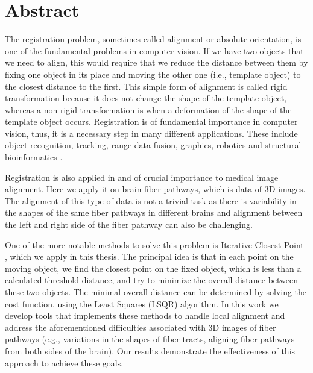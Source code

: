 \documentclass[../structure.tex]{subfiles}
\begin{document}
\chapter{Abstract}
The registration problem, sometimes called alignment or absolute orientation, is one of the fundamental problems in computer vision. If we have two objects that we need to align, this would require that we reduce the distance between them by fixing one object in its place and moving the other one (i.e., template object) to the closest distance to the first. This simple form of alignment is called rigid transformation because it does not change the shape of the template object, whereas a non-rigid transformation is when a deformation of the shape of the template object occurs. Registration is of fundamental importance in computer vision, thus, it is a necessary step in many different applications. These include object recognition, tracking, range data fusion, graphics, robotics and structural bioinformatics \cite{Li2007}.

Registration is also applied in and of crucial importance to medical image alignment. Here we apply it on brain fiber pathways, which is data of 3D images. The alignment of this type of data is not a trivial task as there is variability  in the shapes of the same fiber pathways in different brains and alignment between the left and right side of the fiber pathway can also be challenging.

One of the more notable methods to solve this problem is Iterative Closest Point , which we apply in this thesis. The principal idea is that in each point on the moving object, we find the closest point on the fixed object, which is less than a calculated threshold distance, and try to minimize the overall distance between these two objects. The minimal overall distance can be determined by solving the cost function, using the Least Squares (LSQR) algorithm. In this work we develop tools that implements these methods to handle local alignment and address the aforementioned difficulties associated with 3D images of fiber pathways (e.g., variations in the shapes of fiber tracts, aligning fiber pathways from both sides of the brain). Our results demonstrate the effectiveness of this approach to achieve these goals.
\end{document}
